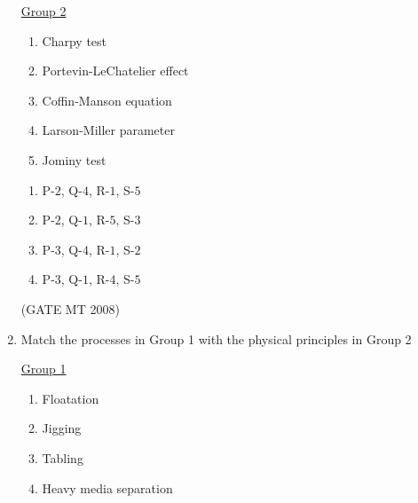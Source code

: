 \documentclass[11pt, letterpaper]{article}
\theoremstyle{remark}
\begin{document}
\begin{enumerate}[label=Q.\arabic*]
\begin{multicols}{2}
     \underline{Group 2}
    \begin{enumerate}[label=(\arabic*), start=1]
        \item Charpy test
        \item Portevin-LeChatelier effect
        \item Coffin-Manson equation
        \item Larson-Miller parameter
        \item Jominy test
    \end{enumerate}
\end{multicols}    
\vspace{-2em}
\begin{multicols}{2}
      \begin{enumerate}
        \item P-$2$, Q-$4$, R-$1$, S-$5$
        \item P-$2$, Q-$1$, R-$5$, S-$3$
        \item P-$3$, Q-$4$, R-$1$, S-$2$
        \item P-$3$, Q-$1$, R-$4$, S-$5$
      \end{enumerate}
    \end{multicols}
\vspace{-5mm}    
\hfill(GATE MT 2008)

\item Match the processes in Group 1 with the physical principles in Group 2

\begin{multicols}{2}
    \underline{Group 1}
    \begin{enumerate}[label=(\Alph*), start=16]
        \item Floatation
        \item Jigging
        \item Tabling
        \item Heavy media separation
    \end{enumerate}


\end{multicols}
\end{enumerate}
\end{document}
